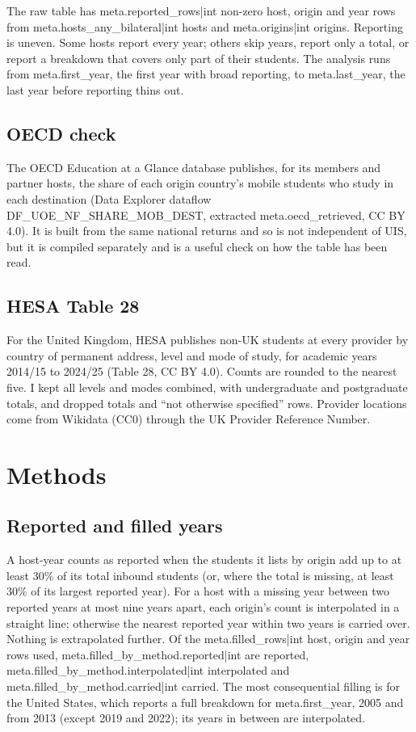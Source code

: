 \documentclass[11pt,a4paper]{article}
\begin{document}
The raw table has {{meta.reported_rows|int}} non-zero host, origin and year rows from {{meta.hosts_any_bilateral|int}} hosts and {{meta.origins|int}} origins. Reporting is uneven. Some hosts report every year; others skip years, report only a total, or report a breakdown that covers only part of their students. The analysis runs from {{meta.first_year}}, the first year with broad reporting, to {{meta.last_year}}, the last year before reporting thins out.

\subsection{OECD check}

The OECD Education at a Glance database publishes, for its members and partner hosts, the share of each origin country's mobile students who study in each destination (Data Explorer dataflow DF\_UOE\_NF\_SHARE\_MOB\_DEST, extracted {{meta.oecd_retrieved}}, CC BY 4.0). It is built from the same national returns and so is not independent of UIS, but it is compiled separately and is a useful check on how the table has been read.

\subsection{HESA Table 28}

For the United Kingdom, HESA publishes non-UK students at every provider by country of permanent address, level and mode of study, for academic years 2014/15 to 2024/25 (Table 28, CC BY 4.0). Counts are rounded to the nearest five. I kept all levels and modes combined, with undergraduate and postgraduate totals, and dropped totals and ``not otherwise specified'' rows. Provider locations come from Wikidata (CC0) through the UK Provider Reference Number.

\section{Methods}

\subsection{Reported and filled years}

A host-year counts as reported when the students it lists by origin add up to at least 30\% of its total inbound students (or, where the total is missing, at least 30\% of its largest reported year). For a host with a missing year between two reported years at most nine years apart, each origin's count is interpolated in a straight line; otherwise the nearest reported year within two years is carried over. Nothing is extrapolated further. Of the {{meta.filled_rows|int}} host, origin and year rows used, {{meta.filled_by_method.reported|int}} are reported, {{meta.filled_by_method.interpolated|int}} interpolated and {{meta.filled_by_method.carried|int}} carried. The most consequential filling is for the United States, which reports a full breakdown for {{meta.first_year}}, 2005 and from 2013 (except 2019 and 2022); its years in between are interpolated.
\end{document}
